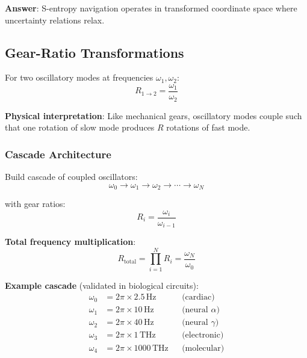 \documentclass[11pt,onecolumn]{article}
\begin{document}
\textbf{Answer}: S-entropy navigation operates in transformed coordinate space where uncertainty relations relax.

\subsection{Gear-Ratio Transformations}

\begin{definition}
For two oscillatory modes at frequencies $\omega_1, \omega_2$:
\begin{equation}
R_{1 \to 2} = \frac{\omega_1}{\omega_2}
\end{equation}
\end{definition}

\textbf{Physical interpretation}: Like mechanical gears, oscillatory modes couple such that one rotation of slow mode produces $R$ rotations of fast mode.

\subsubsection{Cascade Architecture}

Build cascade of coupled oscillators:
\begin{equation}
\omega_0 \to \omega_1 \to \omega_2 \to \cdots \to \omega_N
\end{equation}

with gear ratios:
\begin{equation}
R_i = \frac{\omega_i}{\omega_{i-1}}
\end{equation}

\textbf{Total frequency multiplication}:
\begin{equation}
R_{\text{total}} = \prod_{i=1}^{N} R_i = \frac{\omega_N}{\omega_0}
\end{equation}

\textbf{Example cascade} (validated in biological circuits):
\begin{align}
\omega_0 &= 2\pi \times 2.5\,\text{Hz} &&\text{(cardiac)} \\
\omega_1 &= 2\pi \times 10\,\text{Hz} &&\text{(neural } \alpha) \\
\omega_2 &= 2\pi \times 40\,\text{Hz} &&\text{(neural } \gamma) \\
\omega_3 &= 2\pi \times 1\,\text{THz} &&\text{(electronic)} \\
\omega_4 &= 2\pi \times 1000\,\text{THz} &&\text{(molecular)}
\end{align}
\end{document}

